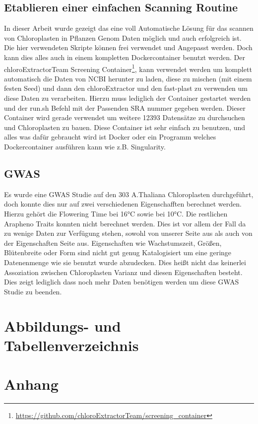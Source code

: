\documentclass{scrartcl}
\begin{document}
\subsection{Etablieren einer einfachen Scanning Routine}
\label{sec-5-5}
In dieser Arbeit wurde gezeigt das eine voll Automatische Lösung für das scannen von Chloroplasten in Pflanzen Genom Daten möglich und auch erfolgreich ist. Die hier verwendeten Skripte können frei verwendet und Angepasst werden. 
Doch kann dies alles auch in einem kompletten Dockercontainer benutzt werden. Der chloroExtractorTeam Screening Container\footnote{\url{https://github.com/chloroExtractorTeam/screening_container}}, kann verwendet werden um komplett automatisch die Daten von NCBI herunter zu laden, diese zu mischen
(mit einem festen Seed) und dann den chloroExtractor und den fast-plast zu verwenden um diese Daten zu verarbeiten. Hierzu muss lediglich der Container gestartet werden und der run.sh Befehl mit der Passenden SRA nummer gegeben 
werden. Dieser Container wird gerade verwendet um weitere 12393 Datensätze zu durchsuchen und Chloroplasten zu bauen. Diese Container ist sehr einfach zu benutzen, und alles was dafür gebraucht wird ist Docker\footnotemark[35]{} oder ein Programm
welches Dockercontainer ausführen kann wie z.B. Singularity\footnotemark[43]{}. 
\subsection{GWAS}
\label{sec-5-6}
Es wurde eine GWAS Studie auf den 303 A.Thaliana Chloroplasten durchgeführt, doch konnte dies nur auf zwei verschiedenen Eigenschafften berechnet werden. Hierzu gehört die Flowering Time bei 16°C sowie bei 10°C. 
Die restlichen Arapheno Traits konnten nicht berechnet werden. Dies ist vor allem der Fall da zu wenige Daten zur Verfügung stehen, sowohl von unserer Seite aus als auch von der Eigenschaften Seite aus. Eigenschaften wie Wachstumszeit,
Größen, Blütenbreite oder Form sind nicht gut genug Katalogisiert um eine geringe Datenenmenge wie sie benutzt wurde abzudecken. Dies heißt nicht das keinerlei Assoziation zwischen Chloroplasten Varianz und diesen Eigenschaften besteht.
Dies zeigt lediglich dass noch mehr Daten benötigen werden um diese GWAS Studie zu beenden‌. 
\section{Abbildungs- und Tabellenverzeichnis}
\label{sec-6}
\listoffigures

\listoftables
\clearpage
\section{Anhang}
\label{sec-7}
\end{document}
